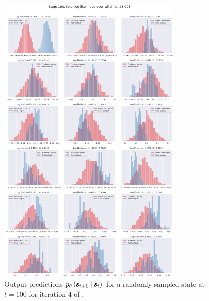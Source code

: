 \begin{figure}
    \centering
    \includegraphics[width=0.8\textwidth]{img/windyslope/output/windyslope_output_det2stoc2_dist_10_step100_iter4.png}
    \caption{Output predictions $\ptheta \protect\given*{\vns}{\vs}$ for a randomly sampled state at $t=100$ for iteration 4 of \dettostoc{}.}
    \label{fig:output_distribution_step100_posvel_dettostoc}
\end{figure}
